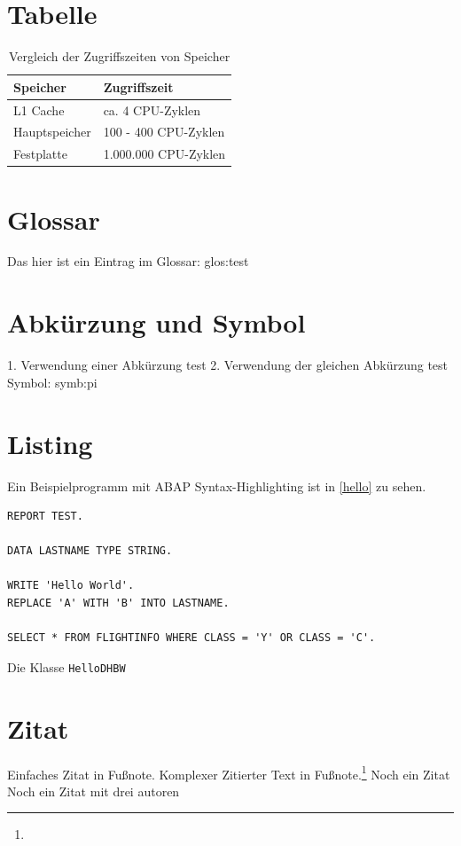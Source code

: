 \section{Tabelle}

\begin{table}[htbp]%
\centering%
\begin{tabular}{| p{3cm} | p{5cm} |}
\hline
Speicher & Zugriffszeit \\
\hline
\hline
L1 Cache & ca. 4 CPU-Zyklen  \\ \hline
Hauptspeicher & 100 - 400 CPU-Zyklen \\ \hline
Festplatte & 1.000.000 CPU-Zyklen \\ \hline
\end{tabular} 
\caption[Vergleich der Zugriffszeiten von Speicher]{Vergleich der Zugriffszeiten von Speicher\label{table:zugriff}\protect \footnotemark}
\end{table}

\section{Glossar}
Das hier ist ein Eintrag im Glossar: \gls{glos:test}

\section{Abkürzung und Symbol}
1. Verwendung einer Abkürzung \gls{test}
2. Verwendung der gleichen Abkürzung \gls{test}
Symbol: \gls{symb:pi}

\section{Listing}
Ein Beispielprogramm mit ABAP Syntax-Highlighting ist in \vref{hello} zu sehen.

\begin{programm}[htbp]
\begin{lstlisting}
REPORT TEST.

DATA LASTNAME TYPE STRING.

WRITE 'Hello World'.
REPLACE 'A' WITH 'B' INTO LASTNAME.

SELECT * FROM FLIGHTINFO WHERE CLASS = 'Y' OR CLASS = 'C'.
\end{lstlisting}
\caption{Die Klasse \texttt{HelloDHBW}\label{hello}}
\end{programm}

\section{Zitat}
Einfaches Zitat in Fußnote. Komplexer Zitierter Text in Fußnote.\footnote{ }
Noch ein Zitat
Noch ein Zitat mit drei autoren

